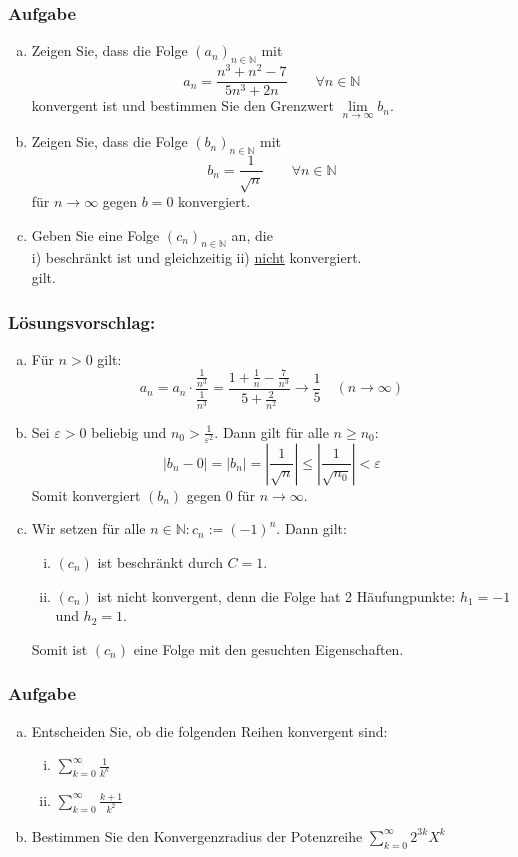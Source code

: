 \documentclass[a4paper,11pt]{scrartcl}
\newcounter{auf}
\newcommand{\Aufgabe}%
        {\addtocounter{auf}{1} \subsubsection*{\rmfamily  Aufgabe \theauf \hspace{1em}} }
\newcommand{\N}{\mathbb{N}}
\begin{document}
\Aufgabe

\begin{enumerate}[a)]

\item Zeigen Sie, dass die Folge $(a_n)_{n \in \N}$ mit 
$$
a_n=\frac{n^3+n^2-7}{5n^3+2n} \qquad \forall n \in \N
$$
konvergent ist und bestimmen Sie den Grenzwert $\lim \limits_{n\to \infty} b_n$.
\item Zeigen Sie, dass die Folge $(b_n)_{n \in \N}$ mit 
$$
b_n=\frac{1}{\sqrt{n}} \qquad \forall n \in \N
$$ 
für $n \to \infty$ gegen $b=0$ konvergiert.
\item Geben Sie eine Folge $(c_n)_{n \in \N}$ an, die \vspace{3mm}\\
\hspace*{5mm} i) beschränkt ist \qquad und gleichzeitig \qquad ii) \underline{nicht} konvergiert. \vspace{3mm}\\
gilt.
\end{enumerate}


\subsubsection*{Lösungsvorschlag:}
\begin{enumerate}[a)]
\item Für $n>0$ gilt: 
$$
a_n=a_n\cdot \frac{\frac{1}{n^3}}{\frac{1}{n^3}}=\frac{1+\frac{1}{n}-\frac{7}{n^3}}{5+\frac{2}{n^2}} \to \frac{1}{5} \quad (n \to \infty)
$$
\item Sei $\varepsilon>0$ beliebig und $n_0 > \frac{1}{\varepsilon^2}$. Dann gilt für alle $n\ge n_0$:
$$
|b_n-0|=|b_n|=|\frac{1}{\sqrt{n}}|\le |\frac{1}{\sqrt{n_0}}|< \varepsilon
$$
Somit konvergiert $(b_n)$ gegen $0$ für $n \to \infty$.
\item Wir setzen für alle $n \in \N: c_n:=(-1)^n$. Dann gilt:
	\begin{enumerate}[i)]
	\item $(c_n)$ ist beschränkt durch $C=1$.
	\item $(c_n)$ ist nicht konvergent, denn die Folge hat 2 Häufungpunkte: $h_1=-1$ und $h_2=1$.
	\end{enumerate}
Somit ist $(c_n)$ eine Folge mit den gesuchten Eigenschaften.
\end{enumerate}


\newpage
\Aufgabe
\begin{enumerate}[a)]
\item Entscheiden Sie, ob die folgenden Reihen konvergent sind:
	\begin{enumerate}[i)]
	\item $\sum \limits_{k=0}^\infty \frac{1}{k^k}$
	\item $\sum \limits_{k=0}^\infty \frac{k+1}{k^2}$
	\end{enumerate}
\item Bestimmen Sie den Konvergenzradius der Potenzreihe $\sum \limits_{k=0}^\infty 2^{3k} X^k$
\end{enumerate}
\end{document}
